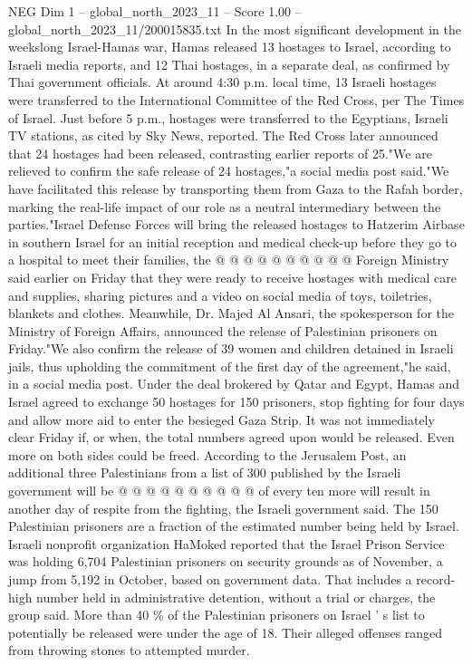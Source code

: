 \begin{textsample}{NEG Dim 1 – global\_north\_2023\_11 – Score 1.00 – global\_north\_2023\_11/200015835.txt}  \label{ex:f1_neg_104}
In the most significant development in the weekslong Israel-Hamas war, Hamas released 13 hostages to Israel, according to Israeli media reports, and 12 Thai hostages, in a separate deal, as confirmed by Thai government officials.
At around 4:30 p.m. local time, 13 Israeli hostages were transferred to the International Committee of the Red Cross, per The Times of Israel.
Just before 5 p.m., hostages were transferred to the Egyptians, Israeli TV stations, as cited by Sky News, reported.
The Red Cross later announced that 24 hostages had been released, contrasting earlier reports of 25."We are relieved to confirm the safe release of 24 hostages,"a social media post said."We have facilitated this release by transporting them from Gaza to the Rafah border, marking the real-life impact of our role as a neutral intermediary between the parties."Israel Defense Forces will bring the released hostages to Hatzerim Airbase in southern Israel for an initial reception and medical check-up before they go to a hospital to meet their families, the @ @ @ @ @ @ @ @ @ @ Foreign Ministry said earlier on Friday that they were ready to receive hostages with medical care and supplies, sharing pictures and a video on social media of toys, toiletries, blankets and clothes.
Meanwhile, Dr.
Majed Al Ansari, the spokesperson for the Ministry of Foreign Affairs, announced the release of Palestinian prisoners on Friday."We also confirm the release of 39 women and children detained in Israeli jails, thus upholding the commitment of the first day of the agreement,"he said, in a social media post.
Under the deal brokered by Qatar and Egypt, Hamas and Israel agreed to exchange 50 hostages for 150 prisoners, stop fighting for four days and allow more aid to enter the besieged Gaza Strip.
It was not immediately clear Friday if, or when, the total numbers agreed upon would be released.
Even more on both sides could be freed.
According to the Jerusalem Post, an additional three Palestinians from a list of 300 published by the Israeli government will be @ @ @ @ @ @ @ @ @ @ of every ten more will result in another day of respite from the fighting, the Israeli government said.
The 150 Palestinian prisoners are a fraction of the estimated number being held by Israel.
Israeli nonprofit organization HaMoked reported that the Israel Prison Service was holding 6,704 Palestinian prisoners on security grounds as of November, a jump from 5,192 in October, based on government data.
That includes a record-high number held in administrative detention, without a trial or charges, the group said.
More than 40 \% of the Palestinian prisoners on Israel ' s list to potentially be released were under the age of 18.
Their alleged offenses ranged from throwing stones to attempted murder.

\end{textsample}
